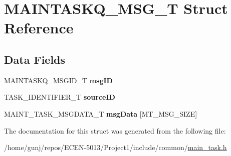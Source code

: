 \hypertarget{structMAINTASKQ__MSG__T}{}\section{M\+A\+I\+N\+T\+A\+S\+K\+Q\+\_\+\+M\+S\+G\+\_\+T Struct Reference}
\label{structMAINTASKQ__MSG__T}
\subsection*{Data Fields}
\begin{DoxyCompactItemize}
\item 
M\+A\+I\+N\+T\+A\+S\+K\+Q\+\_\+\+M\+S\+G\+I\+D\+\_\+T {\bfseries msg\+ID}\hypertarget{structMAINTASKQ__MSG__T_a42b4bf212bc5f1e3cff97ca900552c0e}{}\label{structMAINTASKQ__MSG__T_a42b4bf212bc5f1e3cff97ca900552c0e}

\item 
T\+A\+S\+K\+\_\+\+I\+D\+E\+N\+T\+I\+F\+I\+E\+R\+\_\+T {\bfseries source\+ID}\hypertarget{structMAINTASKQ__MSG__T_a5bbb761b7478733f356d9fe742f47f47}{}\label{structMAINTASKQ__MSG__T_a5bbb761b7478733f356d9fe742f47f47}

\item 
M\+A\+I\+N\+T\+\_\+\+T\+A\+S\+K\+\_\+\+M\+S\+G\+D\+A\+T\+A\+\_\+T {\bfseries msg\+Data} \mbox{[}M\+T\+\_\+\+M\+S\+G\+\_\+\+S\+I\+ZE\mbox{]}\hypertarget{structMAINTASKQ__MSG__T_a0bdf6667da37ec4eff16226085889fcd}{}\label{structMAINTASKQ__MSG__T_a0bdf6667da37ec4eff16226085889fcd}

\end{DoxyCompactItemize}


The documentation for this struct was generated from the following file\+:\begin{DoxyCompactItemize}
\item 
/home/gunj/repos/\+E\+C\+E\+N-\/5013/\+Project1/include/common/\hyperlink{main__task_8h}{main\+\_\+task.\+h}\end{DoxyCompactItemize}
